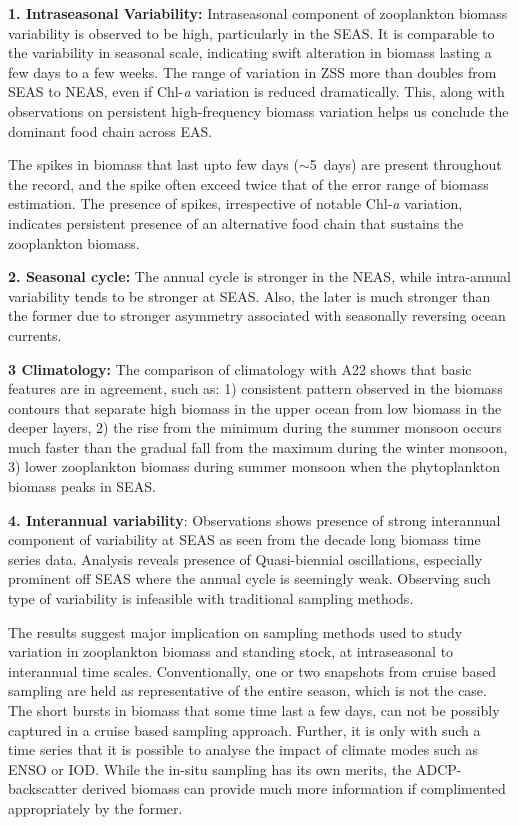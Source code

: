 \documentclass[11pt,a4paper,roman]{moderncv}        %
\begin{document}
	\textbf{1. Intraseasonal Variability:} Intraseasonal component of zooplankton biomass variability is observed to be high, particularly in the SEAS. It is comparable to the variability in seasonal scale, indicating swift alteration in biomass lasting a few days to a few weeks. The range of variation in ZSS more than doubles from SEAS to NEAS, even if Chl-\textit{a} variation is reduced dramatically. This, along with observations on persistent high-frequency biomass variation helps us conclude the dominant food chain across EAS. 
	
	The spikes in biomass that last upto few days ($\sim$5~days) are present throughout the record, and the spike often exceed twice that of the error range of biomass estimation. The presence of spikes, irrespective of notable Chl-\textit{a} variation, indicates persistent presence of an alternative food chain that sustains the zooplankton biomass. 

	\textbf{2. Seasonal cycle:} The annual cycle is stronger in the NEAS, while intra-annual variability tends to be stronger at SEAS. Also, the later is much stronger than the former due to stronger asymmetry associated with seasonally reversing ocean currents. 

	\textbf{3 Climatology:} The comparison of climatology with A22 shows that basic features are in agreement, such as: 1) consistent pattern observed in the biomass contours that separate high biomass in the upper ocean from low biomass in the deeper layers, 2) the rise from the minimum during the summer monsoon occurs much faster than the gradual fall from the maximum during the winter monsoon, 3) lower zooplankton biomass during summer monsoon when the  phytoplankton biomass peaks in SEAS.
	
	\textbf{4. Interannual variability}: Observations shows presence of strong interannual component of variability at SEAS as seen from the decade long biomass time series data. Analysis reveals presence of Quasi-biennial oscillations, especially prominent off SEAS where the annual cycle is seemingly weak. Observing such type of variability is infeasible with traditional sampling methods. 
	
	The results suggest major implication on sampling methods used to study variation in zooplankton biomass and standing stock, at intraseasonal to interannual time scales. Conventionally, one or two snapshots from cruise based sampling are held as representative of the entire season, which is not the case. The short bursts in biomass that some time last a few days, can not be possibly captured in a cruise based sampling approach. Further, it is only with such a time series that it is possible to analyse the impact of climate modes such as ENSO or IOD. While the in-situ sampling has its own merits, the ADCP-backscatter derived biomass can provide much more information	if complimented appropriately by the former.
	
\end{document}

